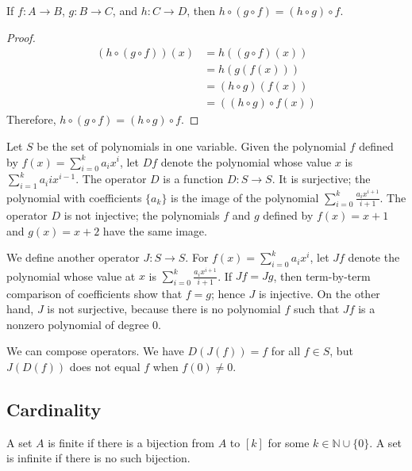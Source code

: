 \documentclass[../main.tex]{subfiles}
\begin{document}
\begin{prop} 
    If $f: A \rightarrow B$, $g: B \rightarrow C$, and $h: C \rightarrow D$, then $h \circ (g \circ f) = (h \circ g) \circ f$.
\end{prop}
\begin{proof}
    \begin{align*}
        (h \circ (g \circ f))(x) &= h((g \circ f)(x))\\
                                 &= h(g(f(x)))\\
                                 &= (h \circ g)(f(x))\\
                                 &= ((h \circ g) \circ f(x))
    \end{align*}
    Therefore, $h \circ (g \circ f) = (h \circ g) \circ f$.
\end{proof}

\begin{ex}
    Let $S$ be the set of polynomials in one variable.
    Given the polynomial $f$ defined by $f(x) = \sum_{i = 0}^k a_i x^i$, let $Df$ denote the polynomial whose value $x$ is $\sum_{i=1}^k a_i i x^{i-1}$.
    The operator $D$ is a function $D: S \rightarrow S$.
    It is surjective; the polynomial with coefficients $\{a_k\}$ is the image of the polynomial $\sum_{i=0}^k \frac{a_i x^{i+1}}{i + 1}$.
    The operator $D$ is not injective; the polynomials $f$ and $g$ defined by $f(x) = x + 1$ and $g(x) = x + 2$ have the same image.

    We define another operator $J: S \rightarrow S$.
    For $f(x) = \sum_{i=0}^k a_i x^i$, let $Jf$ denote the polynomial whose value at $x$ is $\sum_{i=0}^k \frac{a_i x^{i+1}}{i + 1}$.
    If $Jf = Jg$, then term-by-term comparison of coefficients show that $f = g$; hence $J$ is injective.
    On the other hand, $J$ is not surjective, because there is no polynomial $f$ such that $Jf$ is a nonzero polynomial of degree 0.

    We can compose operators.
    We have $D(J(f)) = f$ for all $f \in S$, but $J(D(f))$ does not equal $f$ when $f(0) \neq 0$.
\end{ex}

\subsection{Cardinality}
\begin{defn}
    A set $A$ is \textsf{finite} if there is a bijection from $A$ to $[k]$ for some $k \in \mathbb{N} \cup \{0\}$.
    A set is \textsf{infinite} if there is no such bijection.
\end{defn}
\end{document}
